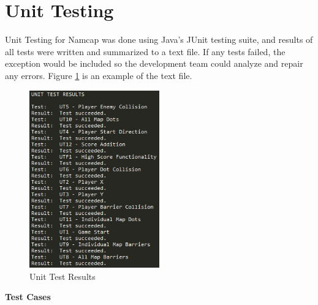 \documentclass[12pt, titlepage]{article}
\begin{document}
\section{Unit Testing}

Unit Testing for Namcap was done using Java's JUnit testing suite, and results of all tests were written and summarized to a text file. If any tests failed, the exception would be included so the development team could analyze and repair any errors. Figure \ref{FigUTR} is an example of the text file.

\begin{figure}[H]
\centering
\includegraphics[width=0.5\textwidth]{UnitTestResults.png}
\caption{Unit Test Results}
\label{FigUTR}
\end{figure}

{\bf Test Cases}
\end{document}
